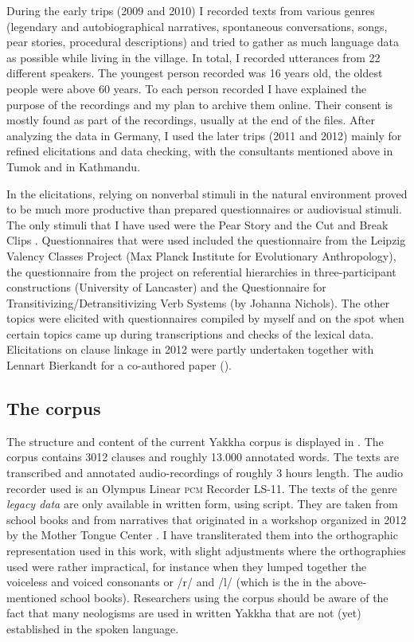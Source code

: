  
During the early trips (2009 and 2010) I recorded texts from various genres (legendary and autobiographical narratives, spontaneous conversations, songs, pear stories, procedural descriptions) and tried to gather as much language data as possible while living in the village. In total, I recorded utterances from 22 different speakers. The youngest person recorded was 16 years old, the oldest people were above 60 years. To each person recorded I have explained the purpose of the recordings and my plan to archive them online. Their consent is mostly found as part of the recordings, usually at the end of the files.  After analyzing the data in Germany, I used the later trips (2011 and 2012) mainly for refined elicitations and data checking, with the consultants mentioned above in Tumok and in Kathmandu. 

In the elicitations, relying on nonverbal stimuli in the natural environment proved to be much more productive than prepared questionnaires or audiovisual stimuli. The only stimuli that I have used were the Pear Story \citep{Chafe1980The-Pear} and the Cut and Break Clips \citep{Bohnemeyeretal2010_cut}. Questionnaires that were used included the questionnaire from the Leipzig Valency Classes Project (Max Planck Institute for Evolutionary Anthropology), the questionnaire from the project on referential hierarchies in three-participant constructions (University of Lancaster) and the Questionnaire for Transitivizing/Detransitivizing Verb Systems (by Johanna Nichols). The other topics were elicited with questionnaires compiled by myself and on the spot when certain topics came up during transcriptions and checks of the lexical data. Elicitations on clause linkage in 2012 were partly undertaken together with Lennart Bierkandt for a co-authored paper (\citealt{Bierkandtetal_Scope}).

\subsection{The corpus}\label{corpus}

The structure and content of the current Yakkha corpus is displayed in . The corpus contains 3012 clauses and roughly 13.000 annotated words. The texts are transcribed and annotated audio-recordings of roughly 3 hours length. The audio recorder used is an Olympus Linear \textsc{pcm} Recorder LS-11. The texts of the genre \emph{legacy data} are only available in written form, using  script. They are taken from school books \citep{Jimi2009Engka-Yakkha, Jimi2010Engka-Yakkha} and from narratives that originated in a workshop organized in 2012 by the Mother Tongue Center  \citep{Jimee2012_Casuwa, Jimee2012_Owl, Linkha2012_Ashes}. I have transliterated them into the orthographic representation used in this work, with slight adjustments where the orthographies used  were rather impractical, for instance when they lumped together the voiceless and voiced consonants or /r/ and /l/ (which is the  in the above-mentioned school books). Researchers using the corpus should be aware of the fact that many neologisms are used in written Yakkha that are not (yet) established in the spoken language. 




